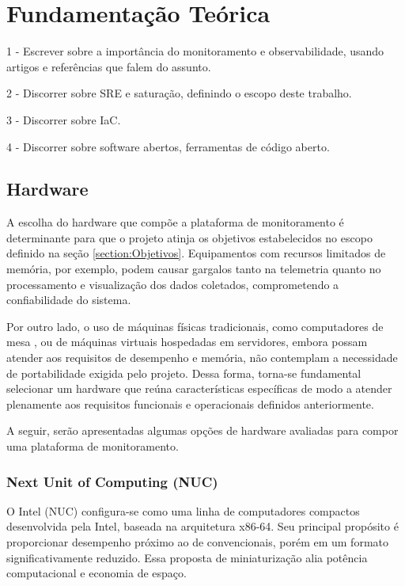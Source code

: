 \chapter{Fundamentação Teórica}
\label{chap2}

1 - Escrever sobre a importância do monitoramento e observabilidade, usando artigos e referências que falem do assunto.

2 - Discorrer sobre SRE e saturação, definindo o escopo deste trabalho.

3 - Discorrer sobre IaC.

4 - Discorrer sobre software abertos, ferramentas de código aberto.


\section{Hardware}
\label{section:Hardware}

A escolha do hardware que compõe a plataforma de monitoramento é determinante para que o projeto atinja os objetivos estabelecidos no escopo definido na seção \ref{section:Objetivos}. Equipamentos com recursos limitados de memória, por exemplo, podem causar gargalos tanto na telemetria quanto no processamento e visualização dos dados coletados, comprometendo a confiabilidade do sistema.

Por outro lado, o uso de máquinas físicas tradicionais, como computadores de mesa , ou de máquinas virtuais hospedadas em servidores, embora possam atender aos requisitos de desempenho e memória, não contemplam a necessidade de portabilidade exigida pelo projeto. Dessa forma, torna-se fundamental selecionar um hardware que reúna características específicas de modo a atender plenamente aos requisitos funcionais e operacionais definidos anteriormente.

A seguir, serão apresentadas algumas opções de hardware avaliadas para compor uma plataforma de monitoramento.

\subsection{Next Unit of Computing (NUC)}
\label{subsection:NUC}

O Intel  (NUC) \citep{nuc2025} configura-se como uma linha de computadores compactos desenvolvida pela Intel, baseada na arquitetura x86-64. Seu principal propósito é proporcionar desempenho próximo ao de  convencionais, porém em um formato significativamente reduzido. Essa proposta de miniaturização alia potência computacional e economia de espaço.

